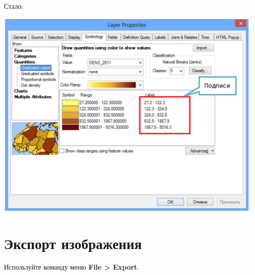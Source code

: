 \documentclass[]{book}
\theoremstyle{definition}
\theoremstyle{definition}
\theoremstyle{definition}
\theoremstyle{remark}
\begin{document}
Стало:

\includegraphics{images/Appendix/image63.png}

\hypertarget{manual-export}{%
\chapter{Экспорт изображения}\label{manual-export}}

Используйте команду меню \textbf{File \textgreater{} Export}.
\end{document}
